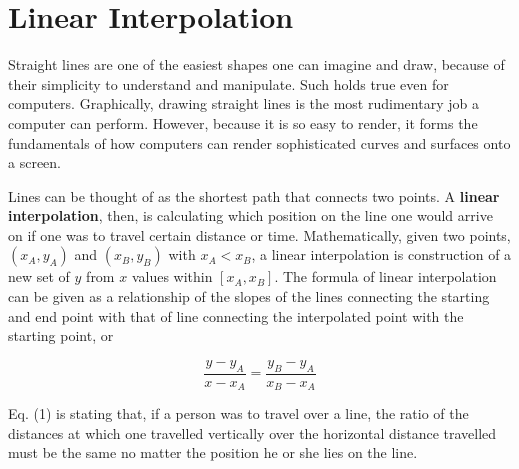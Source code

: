 \documentclass[11pt, oneside]{article}
\theoremstyle{definition}
\numberwithin{figure}{section}
\begin{document}

\section{Linear Interpolation}

Straight lines are one of the easiest shapes one can imagine and draw, because of their simplicity to understand and manipulate. Such holds true even for computers. Graphically, drawing straight lines is the most rudimentary job a computer can perform. However, because it is so easy to render, it forms the fundamentals of how computers can render sophisticated curves and surfaces onto a screen.

Lines can be thought of as the shortest path that connects two points. A \textbf{linear interpolation}, then, is calculating which position on the line one would arrive on if one was to travel certain distance or time. Mathematically, given two points, $(x_A, y_A)$ and $(x_B,y_B)$ with $x_A < x_B$, a linear interpolation is construction of a new set of $y$ from $x$ values within $[x_A, x_B]$. The formula of linear interpolation can be given as a relationship of the slopes of the lines connecting the starting and end point with that of line connecting the interpolated point with the starting point, or

\begin{equation}
\frac{y-y_A}{x-x_A}=\frac{y_B-y_A}{x_B-x_A}
\end{equation}

Eq. (1) is stating that, if a person was to travel over a line, the ratio of the distances at which one travelled vertically over the horizontal distance travelled must be the same no matter the position he or she lies on the line.
\end{document}
